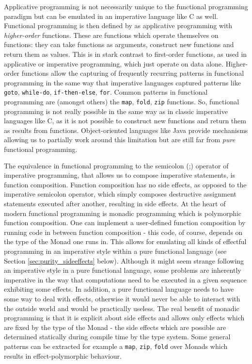 Applicative programming is not necessarily unique to the functional programming paradigm but can be emulated in an imperative language like C as well. Functional programming is then defined by \cite{maclennan_functional_1990} as applicative programming with \textit{higher-order} functions. These are functions which operate themselves on functions: they can take functions as arguments, construct new functions and return them as values. This is in stark contrast to first-order functions, as used in applicative or imperative programming, which just operate on data alone. Higher-order functions allow the capturing of frequently recurring patterns in functional programming in the same way that imperative languages captured patterns like \texttt{goto}, \texttt{while-do}, \texttt{if-then-else}, \texttt{for}. Common patterns in functional programming are (amongst others) the \texttt{map}, \texttt{fold}, \texttt{zip} functions. So, functional programming is not really possible in the same way as in classic imperative languages like C, as it is not possible to construct new functions and return them as results from functions. Object-oriented languages like Java provide mechanisms allowing us to partially work around this limitation but are still far from \textit{pure} functional programming.

The equivalence in functional programming to the semicolon (;) operator of imperative programming, that allows us to compose imperative statements, is function composition. Function composition has no side effects, as opposed to the imperative semicolon operator, which simply composes destructive assignment statements executed after another, resulting in side effects.
At the heart of modern functional programming is monadic programming which is polymorphic function composition. One can implement a user-defined function composition by running code in between function composition - this code, of course, depends on the type of the Monad one runs in. This allows for emulating all kinds of effectful programming in an imperative style within a pure functional language (see Section \ref{sec:purity_sideeffects} below). Although it might seem strange following an imperative style in a pure functional language, some problems are inherently imperative in the way that computations need to be executed in a given sequence exhibiting some effects. In addition, a pure functional language needs to have some way to deal with effects, otherwise it would never be able to interact with the outside world and would be practically useless. The real benefit of monadic programming is that it is explicit about side effects and allows only effects which are fixed by the type of the Monad - the side effects which are possible are determined statically during compile time by the type system. Some general patterns can be extracted for example a \texttt{map}, \texttt{zip}, \texttt{fold} over Monads which results in effect-polymorphic behaviour. %

